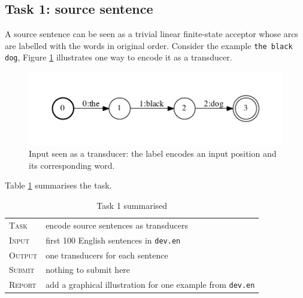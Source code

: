 

\subsection{Task 1: source sentence}

A source sentence can be seen as a trivial linear finite-state acceptor whose arcs are labelled with the words in original order. Consider the example \texttt{the black dog}, Figure \ref{fig:src} illustrates one way to encode it as a transducer.

\begin{figure}[h]\centering
\includegraphics[scale=0.5]{src.pdf}
\caption{\label{fig:src}Input seen as a transducer: the label encodes an input position and its corresponding word.}
\end{figure}

Table \ref{tab:task1} summarises the task. 

\begin{table}[h]\centering
\begin{tabular}{l p{12cm}}
\textsc{Task}   &  encode source sentences as transducers \\
\textsc{Input}  &  first 100 English sentences in \texttt{dev.en} \\
\textsc{Output} &  one transducers for each sentence\\
\textsc{Submit} & nothing to submit here\\
\textsc{Report} & add a graphical illustration for one example from \texttt{dev.en} \\
\end{tabular}
\caption{\label{tab:task1}Task 1 summarised}
\end{table}
